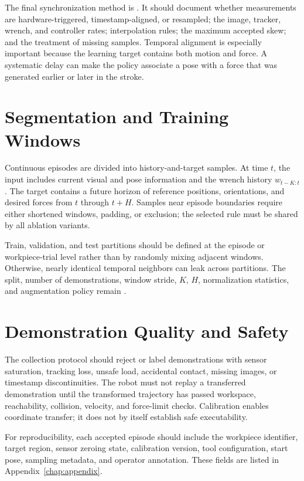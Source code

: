 The final synchronization method is . It should document whether measurements are hardware-triggered, timestamp-aligned, or resampled; the image, tracker, wrench, and controller rates; interpolation rules; the maximum accepted skew; and the treatment of missing samples. Temporal alignment is especially important because the learning target contains both motion and force. A systematic delay can make the policy associate a pose with a force that was generated earlier or later in the stroke.

\section{Segmentation and Training Windows}
Continuous episodes are divided into history-and-target samples. At time \(t\), the input includes current visual and pose information and the wrench history \(w_{t-K:t}\). The target contains a future horizon of reference positions, orientations, and desired forces from \(t\) through \(t+H\). Samples near episode boundaries require either shortened windows, padding, or exclusion; the selected rule must be shared by all ablation variants.

Train, validation, and test partitions should be defined at the episode or workpiece-trial level rather than by randomly mixing adjacent windows. Otherwise, nearly identical temporal neighbors can leak across partitions. The split, number of demonstrations, window stride, \(K\), \(H\), normalization statistics, and augmentation policy remain .

\section{Demonstration Quality and Safety}
The collection protocol should reject or label demonstrations with sensor saturation, tracking loss, unsafe load, accidental contact, missing images, or timestamp discontinuities. The robot must not replay a transferred demonstration until the transformed trajectory has passed workspace, reachability, collision, velocity, and force-limit checks. Calibration enables coordinate transfer; it does not by itself establish safe executability.

For reproducibility, each accepted episode should include the workpiece identifier, target region, sensor zeroing state, calibration version, tool configuration, start pose, sampling metadata, and operator annotation. These fields are listed in Appendix~\ref{chap:appendix}.
